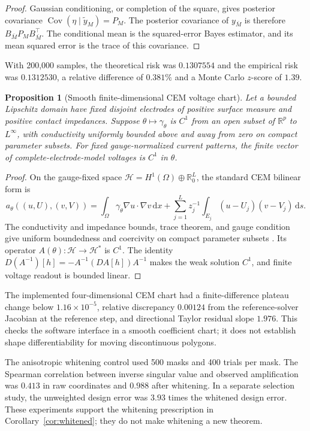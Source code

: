 \documentclass[11pt]{article}
\newtheorem{proposition}[theorem]{Proposition}
\theoremstyle{definition}
\newcommand{\R}{\mathbb R}
\newcommand{\dd}{\,\mathrm d}
\begin{document}
\begin{proof}
Gaussian conditioning, or completion of the square, gives posterior covariance
$\operatorname{Cov}(\eta\mid\widetilde y_M)=P_M$.  The posterior covariance of
$y_{\bar M}$ is therefore $B_{\bar M}P_MB_{\bar M}^\top$.  The conditional
mean is the squared-error Bayes estimator, and its mean squared error is the
trace of this covariance.
\end{proof}

With 200,000 samples, the theoretical risk was $0.1307554$ and the empirical
risk was $0.1312530$, a relative difference of $0.381\%$ and a Monte Carlo
$z$-score of $1.39$.

\begin{proposition}[Smooth finite-dimensional CEM voltage chart]
\label{prop:cem}
Let a bounded Lipschitz domain have fixed disjoint electrodes of positive
surface measure and positive contact impedances.  Suppose
$\theta\mapsto\gamma_\theta$ is $C^1$ from an open subset of $\R^p$ to
$L^\infty$, with conductivity uniformly bounded above and away from zero on
compact parameter subsets.  For fixed gauge-normalized current patterns, the
finite vector of complete-electrode-model voltages is $C^1$ in $\theta$.
\end{proposition}

\begin{proof}
On the gauge-fixed space $\mathcal H=H^1(\Omega)\oplus\R_0^L$, the standard
CEM bilinear form is
\[
 a_\theta((u,U),(v,V))
 =\int_\Omega\gamma_\theta\nabla u\cdot\nabla v\dd x
 +\sum_{j=1}^Lz_j^{-1}\int_{E_j}(u-U_j)(v-V_j)\dd s.
\]
The conductivity and impedance bounds, trace theorem, and gauge condition give
uniform boundedness and coercivity on compact parameter subsets
\citep{somersalo1992cem}.  Its operator
$A(\theta):\mathcal H\to\mathcal H^*$ is $C^1$.  The identity
$D(A^{-1})[h]=-A^{-1}(DA[h])A^{-1}$ makes the weak solution $C^1$, and finite
voltage readout is bounded linear.
\end{proof}

The implemented four-dimensional CEM chart had a finite-difference plateau
change below $1.16\times10^{-5}$, relative discrepancy $0.00124$ from the
reference-solver Jacobian at the reference step, and directional Taylor
residual slope $1.976$.  This checks the software interface in a smooth
coefficient chart; it does not establish shape differentiability for moving
discontinuous polygons.

The anisotropic whitening control used 500 masks and 400 trials per mask.  The
Spearman correlation between inverse singular value and observed amplification
was $0.413$ in raw coordinates and $0.988$ after whitening.  In a separate
selection study, the unweighted design error was $3.93$ times the whitened
design error.  These experiments support the whitening prescription in
Corollary~\ref{cor:whitened}; they do not make whitening a new theorem.
\end{document}
